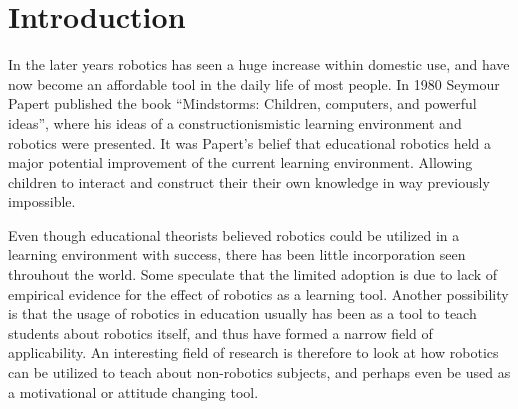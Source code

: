\section*{Introduction}
In the later years robotics has seen a huge increase within domestic use, and have now become an affordable tool in the daily life of most people.
In 1980 Seymour Papert published the book "`Mindstorms: Children, computers, and powerful ideas"'\cite{papert1980mindstorms}, where his ideas of a constructionismistic 
learning environment and robotics were presented. It was Papert's belief that educational robotics held a major potential improvement of the current learning environment.
Allowing children to interact and construct their their own knowledge in way previously impossible. 

\bigskip\noindent
Even though educational theorists believed robotics could be utilized in a learning environment with success, there has been little
incorporation seen throuhout the world. 
Some speculate that the limited adoption is due to lack of empirical evidence for the effect of robotics as a learning tool\cite{williams2007acquisition}.  
Another possibility is that the usage of robotics in education usually has been as a tool to teach students about robotics itself, 
and thus have formed a narrow field of applicability. 
An interesting field of research is therefore to look at how robotics can be utilized to teach about non-robotics subjects, and perhaps even be used as a motivational or attitude changing tool. 
